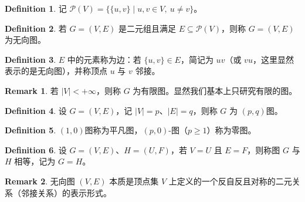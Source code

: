 \documentclass[oneside]{book}
\theoremstyle{definition}
\newtheorem{definition}{Definition}[section]
\newtheorem{remark}{Remark}[section]
\begin{document}
\begin{definition}
	记 \( \mathscr{P}(V) = \{\{u, v\} \mid u, v \in V,\ u \neq v\} \)。
\end{definition}

\begin{definition}
	若 \( G = (V, E) \) 是二元组且满足 \( E \subseteq \mathscr{P}(V) \)，则称 \( G = (V, E) \) 为无向图。
\end{definition}

\begin{definition}
	\( E \) 中的元素称为边：若 \( \{u, v\} \in E \)，简记为 \( uv \)（或 \( vu \)，这里显然表示的是无向图），并称顶点 \( u \) 与 \( v \) 邻接。
\end{definition}

\begin{remark}
	若 \( |V| < +\infty \)，则称 \( G \) 为有限图。显然我们基本上只研究有限的图。
\end{remark}

\begin{definition}
	设 \( G = (V, E) \)，记 \( |V| = p \)、\( |E| = q \)，则称 \( G \) 为 \( (p, q) \)图。
\end{definition}

\begin{definition}
	\( (1, 0) \)图称为平凡图，\( (p, 0) \)-图（\( p \geq 1 \)）称为零图。
\end{definition}

\begin{definition}
	设 \( G = (V, E) \)、\( H = (U, F) \)，若 \( V = U \) 且 \( E = F \)，则称图 \( G \) 与 \( H \) 相等，记为 \( G = H \)。
\end{definition}

\begin{remark}
	无向图 \( (V, E) \) 本质是顶点集 \( V \) 上定义的一个反自反且对称的二元关系（邻接关系）的表示形式。
\end{remark}
\end{document}
